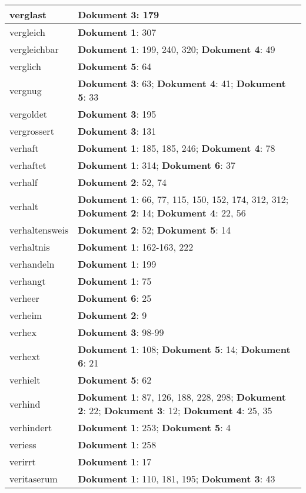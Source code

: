 \documentclass[a5paper]{article}
\begin{document}
\begin{longtable}[l]{|l|p{3in}|}
\hline
verglast & \textbf{Dokument 3}: 179 \\
\hline
vergleich & \textbf{Dokument 1}: 307 \\
\hline
vergleichbar & \textbf{Dokument 1}: 199, 240, 320; \textbf{Dokument 4}: 49 \\
\hline
verglich & \textbf{Dokument 5}: 64 \\
\hline
vergnug & \textbf{Dokument 3}: 63; \textbf{Dokument 4}: 41; \textbf{Dokument 5}: 33 \\
\hline
vergoldet & \textbf{Dokument 3}: 195 \\
\hline
vergrossert & \textbf{Dokument 3}: 131 \\
\hline
verhaft & \textbf{Dokument 1}: 185, 185, 246; \textbf{Dokument 4}: 78 \\
\hline
verhaftet & \textbf{Dokument 1}: 314; \textbf{Dokument 6}: 37 \\
\hline
verhalf & \textbf{Dokument 2}: 52, 74 \\
\hline
verhalt & \textbf{Dokument 1}: 66, 77, 115, 150, 152, 174, 312, 312; \textbf{Dokument 2}: 14; \textbf{Dokument 4}: 22, 56 \\
\hline
verhaltensweis & \textbf{Dokument 2}: 52; \textbf{Dokument 5}: 14 \\
\hline
verhaltnis & \textbf{Dokument 1}: 162-163, 222 \\
\hline
verhandeln & \textbf{Dokument 1}: 199 \\
\hline
verhangt & \textbf{Dokument 1}: 75 \\
\hline
verheer & \textbf{Dokument 6}: 25 \\
\hline
verheim & \textbf{Dokument 2}: 9 \\
\hline
verhex & \textbf{Dokument 3}: 98-99 \\
\hline
verhext & \textbf{Dokument 1}: 108; \textbf{Dokument 5}: 14; \textbf{Dokument 6}: 21 \\
\hline
verhielt & \textbf{Dokument 5}: 62 \\
\hline
verhind & \textbf{Dokument 1}: 87, 126, 188, 228, 298; \textbf{Dokument 2}: 22; \textbf{Dokument 3}: 12; \textbf{Dokument 4}: 25, 35 \\
\hline
verhindert & \textbf{Dokument 1}: 253; \textbf{Dokument 5}: 4 \\
\hline
veriess & \textbf{Dokument 1}: 258 \\
\hline
verirrt & \textbf{Dokument 1}: 17 \\
\hline
veritaserum & \textbf{Dokument 1}: 110, 181, 195; \textbf{Dokument 3}: 43 \\

\end{longtable}
\end{document}
